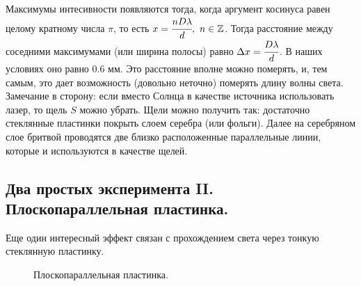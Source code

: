 \documentclass[11pt,a4paper]{article}
\numberwithin{equation}{section}
\begin{document}
Максимумы интесивности появляются тогда, когда аргумент косинуса равен
целому кратному числа $\pi$, то есть $x=\cfrac{n D \lambda}{d}, \mbox{
} n \in \mathbb{Z}$. Тогда расстояние между соседними максимумами (или
ширина полосы) равно $\Delta x = \cfrac{D \lambda}{d}$. В наших
условиях оно равно 0.6 мм. Это расстояние вполне можно померять, и,
тем самым, это дает возможность (довольно неточно) померять длину
волны света. Замечание в сторону: если вместо Солнца в качестве
источника использовать лазер, то щель $S$ можно убрать. Щели можно
получить так: достаточно стеклянные пластинки покрыть слоем серебра
(или фольги). Далее на серебряном слое бритвой проводятся две близко
расположенные параллельные линии, которые и используются в качестве
щелей.

\subsection{Два простых эксперимента II. Плоскопараллельная пластинка.}
Еще один интересный эффект связан с прохождением света через тонкую стеклянную пластинку. 

\begin{figure}[h]
  \centering
  \caption{Плоскопараллельная пластинка.}
  \label{fig:plate}
\end{figure}
\end{document}
